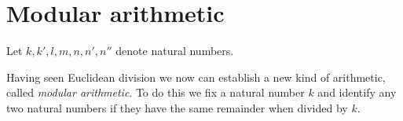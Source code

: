 \documentclass[../../arithmetic.ftl.tex]{subfiles}
\begin{document}
  \begin{comment}
    \begin{forthel}

    \end{forthel}
  \end{comment}


  \section{Modular arithmetic}

  \begin{forthel}
  \end{forthel}

  \begin{forthel}
    Let $k, k', l, m, n, n', n''$ denote natural numbers.
  \end{forthel}

  \noindent Having seen Euclidean division we now can establish a new kind of
  arithmetic, called \textit{modular arithmetic}. To do this we fix a natural
  number $k$ and identify any two natural numbers if they have the same
  remainder when divided by $k$.
\end{document}
